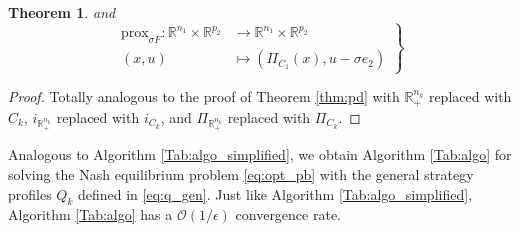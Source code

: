 \documentclass{article} %
\newtheorem{theorem}{Theorem} \newtheorem{lemma}[theorem]{Lemma}
\begin{document}
\begin{theorem}
  and
  \begin{equation}
    \left .
    \begin{split}
      \text{prox}_{\sigma F}: \mathbb{R}^{n_1} \times \mathbb{R}^{p_2} &\rightarrow \mathbb{R}^{n_1} \times \mathbb{R}^{p_2}\\
      (x, u) &\mapsto (\Pi_{C_1}(x), u - \sigma e_2)
    \end{split}
    \right\}
  \end{equation}
  \label{thm:pd_gen}
\end{theorem}

\begin{proof}
Totally analogous to the proof of Theorem \ref{thm:pd} with $\mathbb{R}^{n_k}_+$ replaced with $C_k$,
$i_{\mathbb{R}^{n_k}_+}$ replaced with $i_{C_k}$, and $\Pi_{\mathbb{R}^{n_k}_+}$ replaced with $\Pi_{C_k}$.
\end{proof}

Analogous to Algorithm \ref{Tab:algo_simplified}, we obtain Algorithm \ref{Tab:algo} for solving the Nash equilibrium problem \ref{eq:opt_pb} with the general strategy profiles $Q_k$ defined in \eqref{eq:q_gen}. Just like Algorithm \ref{Tab:algo_simplified}, Algorithm \ref{Tab:algo} has a $\mathcal{O}(1/\epsilon)$ convergence rate.
\end{document}
